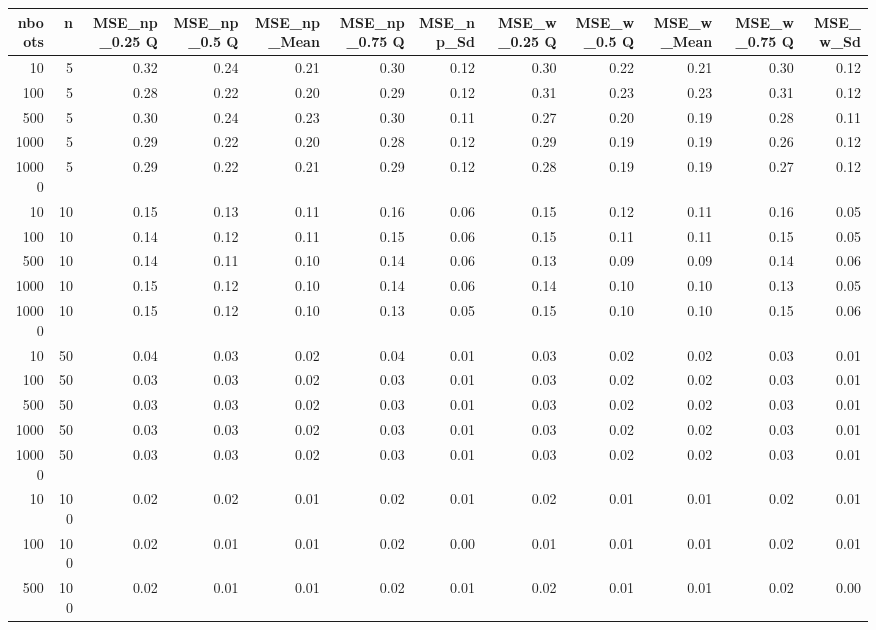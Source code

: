 \begin{table}[ht]
\centering
\begin{tabular}{rrrrrrrrrrrr}
  \hline
nboots & n & MSE\_np\_0.25 Q & MSE\_np\_0.5 Q & MSE\_np\_Mean & MSE\_np\_0.75 Q & MSE\_np\_Sd & MSE\_w\_0.25 Q & MSE\_w\_0.5 Q & MSE\_w\_Mean & MSE\_w\_0.75 Q & MSE\_w\_Sd \\ 
  \hline
10 & 5 & 0.32 & 0.24 & 0.21 & 0.30 & 0.12 & 0.30 & 0.22 & 0.21 & 0.30 & 0.12 \\ 
  100 & 5 & 0.28 & 0.22 & 0.20 & 0.29 & 0.12 & 0.31 & 0.23 & 0.23 & 0.31 & 0.12 \\ 
  500 & 5 & 0.30 & 0.24 & 0.23 & 0.30 & 0.11 & 0.27 & 0.20 & 0.19 & 0.28 & 0.11 \\ 
  1000 & 5 & 0.29 & 0.22 & 0.20 & 0.28 & 0.12 & 0.29 & 0.19 & 0.19 & 0.26 & 0.12 \\ 
  10000 & 5 & 0.29 & 0.22 & 0.21 & 0.29 & 0.12 & 0.28 & 0.19 & 0.19 & 0.27 & 0.12 \\ 
  10 & 10 & 0.15 & 0.13 & 0.11 & 0.16 & 0.06 & 0.15 & 0.12 & 0.11 & 0.16 & 0.05 \\ 
  100 & 10 & 0.14 & 0.12 & 0.11 & 0.15 & 0.06 & 0.15 & 0.11 & 0.11 & 0.15 & 0.05 \\ 
  500 & 10 & 0.14 & 0.11 & 0.10 & 0.14 & 0.06 & 0.13 & 0.09 & 0.09 & 0.14 & 0.06 \\ 
  1000 & 10 & 0.15 & 0.12 & 0.10 & 0.14 & 0.06 & 0.14 & 0.10 & 0.10 & 0.13 & 0.05 \\ 
  10000 & 10 & 0.15 & 0.12 & 0.10 & 0.13 & 0.05 & 0.15 & 0.10 & 0.10 & 0.15 & 0.06 \\ 
  10 & 50 & 0.04 & 0.03 & 0.02 & 0.04 & 0.01 & 0.03 & 0.02 & 0.02 & 0.03 & 0.01 \\ 
  100 & 50 & 0.03 & 0.03 & 0.02 & 0.03 & 0.01 & 0.03 & 0.02 & 0.02 & 0.03 & 0.01 \\ 
  500 & 50 & 0.03 & 0.03 & 0.02 & 0.03 & 0.01 & 0.03 & 0.02 & 0.02 & 0.03 & 0.01 \\ 
  1000 & 50 & 0.03 & 0.03 & 0.02 & 0.03 & 0.01 & 0.03 & 0.02 & 0.02 & 0.03 & 0.01 \\ 
  10000 & 50 & 0.03 & 0.03 & 0.02 & 0.03 & 0.01 & 0.03 & 0.02 & 0.02 & 0.03 & 0.01 \\ 
  10 & 100 & 0.02 & 0.02 & 0.01 & 0.02 & 0.01 & 0.02 & 0.01 & 0.01 & 0.02 & 0.01 \\ 
  100 & 100 & 0.02 & 0.01 & 0.01 & 0.02 & 0.00 & 0.01 & 0.01 & 0.01 & 0.02 & 0.01 \\ 
  500 & 100 & 0.02 & 0.01 & 0.01 & 0.02 & 0.01 & 0.02 & 0.01 & 0.01 & 0.02 & 0.00 \\ 

\end{tabular}
\end{table}
